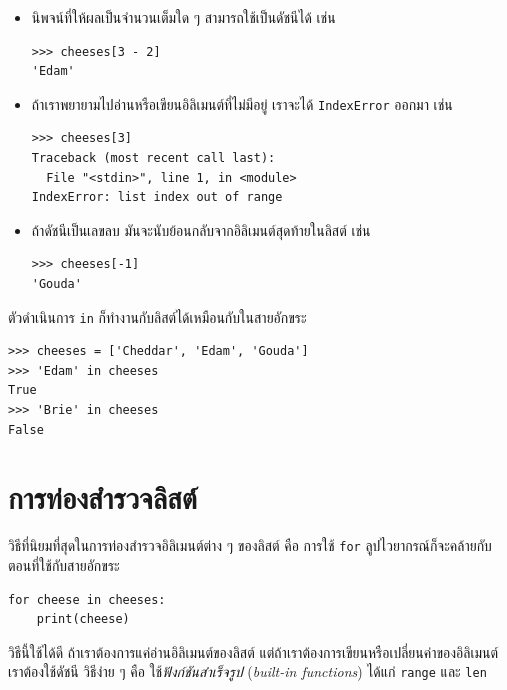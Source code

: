 \begin{itemize}

\item นิพจน์ที่ให้ผลเป็นจำนวนเต็มใด ๆ สามารถใช้เป็นดัชนีได้
เช่น
\begin{verbatim}
>>> cheeses[3 - 2]
'Edam'
\end{verbatim}

\item ถ้าเราพยายามไปอ่านหรือเขียนอิลิเมนต์ที่ไม่มีอยู่
เราจะได้ \texttt{IndexError} ออกมา เช่น
\begin{verbatim}
>>> cheeses[3]
Traceback (most recent call last):
  File "<stdin>", line 1, in <module>
IndexError: list index out of range
\end{verbatim}

\item ถ้าดัชนีเป็นเลขลบ
มันจะนับย้อนกลับจากอิลิเมนต์สุดท้ายในลิสต์ เช่น
\begin{verbatim}
>>> cheeses[-1]
'Gouda'
\end{verbatim}

\end{itemize}


ตัวดำเนินการ \texttt{in} ก็ทำงานกับลิสต์ได้เหมือนกับในสายอักขระ

\begin{verbatim}
>>> cheeses = ['Cheddar', 'Edam', 'Gouda']
>>> 'Edam' in cheeses
True
>>> 'Brie' in cheeses
False
\end{verbatim}

\section{การท่องสำรวจลิสต์}

วิธีที่นิยมที่สุดในการท่องสำรวจอิลิเมนต์ต่าง ๆ ของลิสต์ คือ 
การใช้ \texttt{for} ลูปไวยากรณ์ก็จะคล้ายกับตอนที่ใช้กับสายอักขระ

\begin{verbatim}
for cheese in cheeses:
    print(cheese)
\end{verbatim}
%
วิธีนี้ใช้ได้ดี ถ้าเราต้องการแค่อ่านอิลิเมนต์ของลิสต์
แต่ถ้าเราต้องการเขียนหรือเปลี่ยนค่าของอิลิเมนต์
เราต้องใช้ดัชนี
วิธีง่าย ๆ คือ ใช้\textit{ฟังก์ชันสำเร็จรูป} (\textit{built-in functions}) ได้แก่ \texttt{range} และ \texttt{len}

